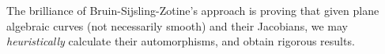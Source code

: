 \documentclass[12pt,reqno]{amsart}
\DeclareMathOperator{\Aut}{Aut}
\newtheorem*{thm*}{Theorem}
\theoremstyle{definition}
\theoremstyle{remark}
\newtheorem*{remark}{Remark}
\begin{document}
The brilliance of Bruin-Sijsling-Zotine's approach is proving that given plane algebraic curves (not necessarily smooth) and their Jacobians, we may \textit{heuristically} calculate their automorphisms, and obtain rigorous results. 













\end{document}
